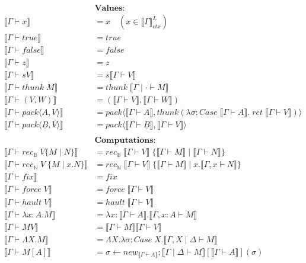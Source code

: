 \documentclass[acmsmall]{acmart}
\newcommand{\den}[1]{\llbracket #1\rrbracket}
\begin{document}
\begin{figure}[H]
  \centering
  \footnotesize
  \begin{align*}
  &\textbf{Values:}\\
  \den{\Gamma \vdash x} &= x \quad (x \in \den{\Gamma}^L_{ctx}) \\
  \den{\Gamma \vdash true} &= true \\
  \den{\Gamma \vdash false} &= false \\
  \den{\Gamma \vdash z} &= z \\
  \den{\Gamma \vdash s V} &= s \den{\Gamma \vdash V} \\
  \den{\Gamma \vdash thunk\;M} &= thunk \; \den{\Gamma \;|\; \cdot \vdash M} \\
  \den{\Gamma \vdash (V,W)} &= (\den{\Gamma \vdash V}, \den{\Gamma \vdash W}) \\
  \den{\Gamma \vdash pack\langle A,V \rangle} &= pack\langle \den{\Gamma \vdash A}, thunk(\lambda \sigma : Case\;\den{\Gamma \vdash A}.\; ret\; \den{\Gamma\vdash V}) \rangle \\
  \den{\Gamma \vdash pack\langle \underline{B},V \rangle} &= pack\langle \den{\Gamma \vdash \underline{B}}, \den{\Gamma \vdash V} \rangle \\
  \\
  &\textbf{Computations:} \\
  \den{\Gamma \vdash rec_{\mathbb{B}}\;V \{M\;|\;N\}} &= rec_{\mathbb{B}}\;\den{\Gamma \vdash V} \;\{\den{\Gamma \vdash M}\;|\;\den{\Gamma \vdash N}\} \\
  \den{\Gamma \vdash rec_{\mathbb{N}}\;V\;\{M \;|\; x. N\}} &= rec_{\mathbb{N}}\;\den{\Gamma \vdash V} \;\{\den{\Gamma \vdash M}\;|\;x. \den{\Gamma, x \vdash N}\} \\
  \den{\Gamma \vdash fix} &= fix \\
  \den{\Gamma \vdash force \;V} &= force\;\den{\Gamma \vdash V} \\
  \den{\Gamma \vdash hault\;V} &= hault\;\den{\Gamma \vdash V} \\
  \den{\Gamma \vdash \lambda x :A. M} &= \lambda x:\den{\Gamma \vdash A}. \den{\Gamma, x : A \vdash M} \\
  \den{\Gamma \vdash MV} &= \den{\Gamma \vdash M}\den{\Gamma \vdash V} \\
  \den{\Gamma \vdash \Lambda X. M} &= \Lambda X. \lambda \sigma : Case\;X. \den{\Gamma,X \;|\;\Delta \vdash M} \\
  \den{\Gamma \vdash M[A]} &= \sigma \leftarrow new_{\den{\Gamma \vdash A}}; \den{\Gamma \;|\;\Delta \vdash M}[\den{\Gamma \vdash A}](\sigma) \\

\end{align*}
\end{figure}
\end{document}
